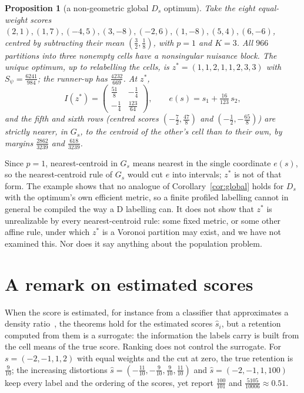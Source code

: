 \documentclass[11pt]{amsart}
\newtheorem{proposition}[theorem]{Proposition}
\theoremstyle{definition}
\theoremstyle{remark}
\begin{document}
\begin{proposition}[a non-geometric global $D_s$ optimum]\label{prop:ds}
Take the eight equal-weight scores
$(2,1),(1,7),(-4,5),(3,-8),(-2,6),(1,-8),(5,4),(6,-6)$, centred by subtracting their mean
$(\tfrac32,\tfrac18)$, with $p=1$ and $K=3$. All $966$ partitions into three nonempty cells have
a nonsingular nuisance block. The unique optimum, up to relabelling the cells, is
$z^*=(1,1,2,1,1,2,3,3)$ with $S_\psi=\tfrac{6241}{984}$; the runner-up has
$\tfrac{4232}{669}$. At $z^*$,
\[
I(z^*)=\begin{pmatrix}\tfrac{51}8&-\tfrac14\\[2pt]-\tfrac14&\tfrac{123}{64}\end{pmatrix},
\qquad e(s)=s_1+\tfrac{16}{123}\,s_2 ,
\]
and the fifth and sixth rows (centred scores $(-\tfrac72,\tfrac{47}8)$ and
$(-\tfrac12,-\tfrac{65}8)$) are strictly nearer, in $G_s$, to the centroid of the other's cell
than to their own, by margins $\tfrac{2862}{3239}$ and $\tfrac{618}{3239}$.
\end{proposition}

Since $p=1$, nearest-centroid in $G_s$ means nearest in the single coordinate $e(s)$, so the
nearest-centroid rule of $G_s$ would cut $e$ into intervals; $z^*$ is not of that form. The
example shows that no analogue of Corollary~\ref{cor:global} holds for $D_s$ with the
optimum's own efficient metric, so a finite profiled labelling cannot in general be compiled the
way a D labelling can. It does not show that $z^*$ is unrealizable by every nearest-centroid
rule: some fixed metric, or some other affine rule, under which $z^*$ is a Voronoi partition may
exist, and we have not examined this. Nor does it say anything about the population problem.

\section{A remark on estimated scores}\label{sec:estimated}

When the score is estimated, for instance from a classifier that approximates a density
ratio~\cite{brehmer2018prl,brehmer2018prd}, the theorems hold for the estimated scores $\hat s_i$,
but a retention computed from them is a surrogate: the information the labels carry is built from
the cell means of the true score. Ranking does not control the surrogate. For $s=(-2,-1,1,2)$
with equal weights and the cut at zero, the true retention is $\tfrac9{10}$; the increasing
distortions $\hat s=(-\tfrac{11}{10},-\tfrac9{10},\tfrac9{10},\tfrac{11}{10})$ and
$\hat s=(-2,-1,1,100)$ keep every label and the ordering of the scores, yet report
$\tfrac{100}{101}$ and $\tfrac{5105}{10006}\approx0.51$.
\end{document}
